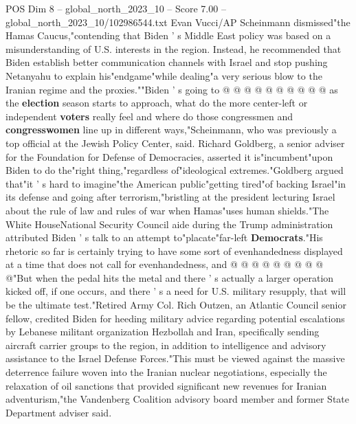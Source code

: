 \begin{textsample}{POS Dim 8 – global\_north\_2023\_10 – Score 7.00 – global\_north\_2023\_10/102986544.txt}
Evan Vucci/AP Scheinmann dismissed"the Hamas Caucus,"contending that Biden ' s Middle East policy was based on a misunderstanding of U.S. interests in the region.
Instead, he recommended that Biden establish better communication channels with Israel and stop pushing Netanyahu to explain his"endgame"while dealing"a very serious blow to the Iranian regime and the proxies.""Biden ' s going to @ @ @ @ @ @ @ @ @ @ as the \textbf{election} season starts to approach, what do the more center-left or independent \textbf{voters} really feel and where do those congressmen and \textbf{congresswomen} line up in different ways,"Scheinmann, who was previously a top official at the Jewish Policy Center, said.
Richard Goldberg, a senior adviser for the Foundation for Defense of Democracies, asserted it is"incumbent"upon Biden to do the"right thing,"regardless of"ideological extremes."Goldberg argued that"it ' s hard to imagine"the American public"getting tired"of backing Israel"in its defense and going after terrorism,"bristling at the president lecturing Israel about the rule of law and rules of war when Hamas"uses human shields."The White HouseNational Security Council aide during the Trump administration attributed Biden ' s talk to an attempt to"placate"far-left \textbf{Democrats}."His rhetoric so far is certainly trying to have some sort of evenhandedness displayed at a time that does not call for evenhandedness, and @ @ @ @ @ @ @ @ @ @"But when the pedal hits the metal and there ' s actually a larger operation kicked off, if one occurs, and there ' s a need for U.S. military resupply, that will be the ultimate test."Retired Army Col.
Rich Outzen, an Atlantic Council senior fellow, credited Biden for heeding military advice regarding potential escalations by Lebanese militant organization Hezbollah and Iran, specifically sending aircraft carrier groups to the region, in addition to intelligence and advisory assistance to the Israel Defense Forces."This must be viewed against the massive deterrence failure woven into the Iranian nuclear negotiations, especially the relaxation of oil sanctions that provided significant new revenues for Iranian adventurism,"the Vandenberg Coalition advisory board member and former State Department adviser said.

\end{textsample}
